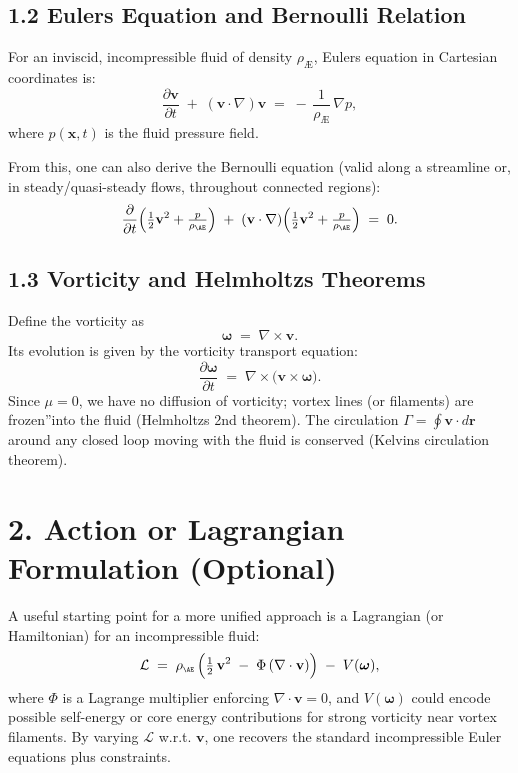 \subsection*{1.2 Euler\rqs s Equation and Bernoulli Relation}
For an inviscid, incompressible fluid of density \(\rho_{\scriptscriptstyle \mathrm{Æ}}\), Euler\rqs s equation in Cartesian coordinates is:
\[
 \frac{\partial \mathbf{v}}{\partial t} \;+\; (\mathbf{v}\cdot\nabla)\mathbf{v} \;=\; -\,\frac{1}{\rho_{\scriptscriptstyle \mathrm{Æ}}}\,\nabla p,
\]
where \(p(\mathbf{x},t)\) is the fluid pressure field.

From this, one can also derive the Bernoulli equation (valid along a streamline or, in steady/quasi-steady flows, throughout connected regions):
\[
 \frac{\partial}{\partial t} \Bigl( \tfrac12 \mathbf{v}^2 + \tfrac{p}{\rho_{\scriptscriptstyle \mathrm{Æ}}} \Bigr) \;+\; (\mathbf{v}\cdot\nabla) \Bigl( \tfrac12 \mathbf{v}^2 + \tfrac{p}{\rho_{\scriptscriptstyle \mathrm{Æ}}} \Bigr) \;=\; 0.
\]

\subsection*{1.3 Vorticity and Helmholtz\rqs s Theorems}
Define the vorticity as
\[
 \boldsymbol{\omega} \;=\; \nabla \times \mathbf{v}.
\]
Its evolution is given by the vorticity transport equation:
\[
 \frac{\partial \boldsymbol{\omega}}{\partial t} \;=\; \nabla\times\bigl(\mathbf{v}\times\boldsymbol{\omega}\bigr).
\]
Since \(\mu=0\), we have no diffusion of vorticity; vortex lines (or filaments) are \grqq frozen\textquotedblright into the fluid (Helmholtz\rqs s 2nd theorem). The circulation \(\Gamma = \oint \mathbf{v}\cdot d\mathbf{r}\) around any closed loop moving with the fluid is conserved (Kelvin\rqs s circulation theorem).

\section*{2. Action or Lagrangian Formulation (Optional)}
A useful starting point for a more unified approach is a Lagrangian (or Hamiltonian) for an incompressible fluid:
\[
 \mathcal{L} \;=\; \rho_{\scriptscriptstyle \mathrm{Æ}}\, \Bigl( \tfrac12\,\mathbf{v}^2 \;-\; \Phi\,(\nabla\cdot\mathbf{v}) \Bigr) \;-\; V(\boldsymbol{\omega}),
\]
where \(\Phi\) is a Lagrange multiplier enforcing \(\nabla\cdot \mathbf{v}=0\), and \(V(\boldsymbol{\omega})\) could encode possible self-energy or core energy contributions for strong vorticity near vortex filaments. By varying \(\mathcal{L}\) w.r.t. \(\mathbf{v}\), one recovers the standard incompressible Euler equations plus constraints.

